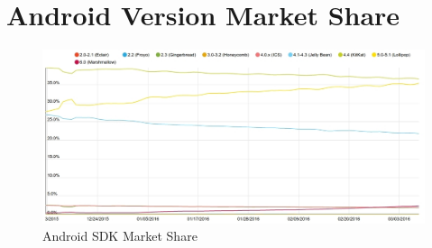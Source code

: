 \chapter{Android Version Market Share}
\label{appendix:sdkmarketshare}

\begin{figure}[ht]
	\centering
	\includegraphics[scale=0.4]{images/AndroidSDKMarketShare.jpg}
	\caption{Android SDK Market Share \citep{appbrainsdkversions}}
\end{figure}